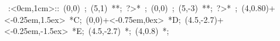 \hbox{
\xy    <1cm,0cm>:<0cm,1cm>::
       (0,0) ; (5,1) **\dir{-}; ?>* \dir{>};
       (0,0) ; (5,-3) **\dir{-}; ?>* \dir{>}; 
	   (4,0.80)+<-0.25em,1.5ex> *{C};
       (0,0)+<-0.75em,0ex> *{D};
       (4.5,-2.7)+<-0.25em,-1.5ex> *{E};
       (4.5,-2.7) *{\bullet};
       (4,0.8) *{\bullet};
       \endxy}
	   
